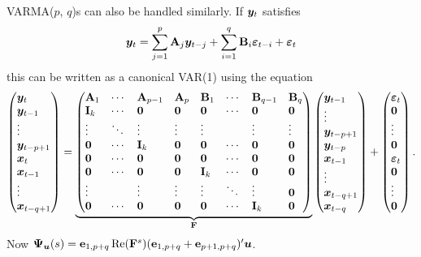 \documentclass[AER,reviewmode]{tex/AEA}
\begin{document}
VARMA($p$, $q$)s can also be handled similarly. If $\bm{y}_t$ satisfies
\begin{equation*}
  \bm{y}_t = \sum_{j=1}^p \mathbf{A}_j \bm{y}_{t-j} + \sum_{i=1}^q \mathbf{B}_i \bm{\varepsilon}_{t-i} + \bm{\varepsilon}_t
\end{equation*}
this can be written as a canonical VAR(1) using the equation
\begin{equation*}
\begin{pmatrix*}[l]
  \yv_t \\ \yv_{t-1} \\ \vdots \\ \yv_{t-p+1} \\
  \xv_t \\ \xv_{t-1} \\ \vdots \\ \xv_{t-q+1}
\end{pmatrix*}
=
\underbrace{\begin{pmatrix*}[l]
  \Am_1   & \cdots & \Am_{p-1} & \Am_p  & \Bm_1   & \cdots & \Bm_{q-1} & \Bm_q  \\
  \Imat_k & \cdots & \Omat     & \Omat  & \Omat   & \cdots & \Omat     & \Omat  \\
  \vdots  & \ddots & \vdots    & \vdots & \vdots  &        & \vdots    & \vdots \\
  \Omat   & \cdots & \Imat_k   & \Omat  & \Omat   & \cdots & \Omat     & \Omat  \\
  \Omat   & \cdots & \Omat     & \Omat  & \Omat   & \cdots & \Omat     & \Omat  \\
  \Omat   & \cdots & \Omat     & \Omat  & \Imat_k & \cdots & \Omat     & \Omat  \\
  \vdots  &        & \vdots    & \vdots & \vdots  & \ddots & \vdots    & \Omat  \\
  \Omat   & \cdots & \Omat     & \Omat  & \Omat   & \cdots & \Imat_k   & \Omat  \\
\end{pmatrix*}}_{\Fm}
\begin{pmatrix*}[l]
  \yv_{t-1} \\ \vdots \\ \yv_{t-p+1} \\ \yv_{t-p} \\
  \xv_{t-1} \\ \vdots \\ \xv_{t-q+1} \\ \xv_{t-q}
\end{pmatrix*}
+
\begin{pmatrix*}[l]
  \vepv_{t} \\ \Ovec \\ \vdots \\ \Ovec \\ \vepv_t \\ \Ovec \\ \vdots \\ \Ovec
\end{pmatrix*}.
\end{equation*}
Now $\bm{\Psi}_{\bm{u}}(s) = \mathbf{e}_{1,p+q} \operatorname{Re}(\mathbf{F}^s) (\mathbf{e}_{1,p+q} + \mathbf{e}_{p+1,p+q})' \bm{u}$.
\end{document}
